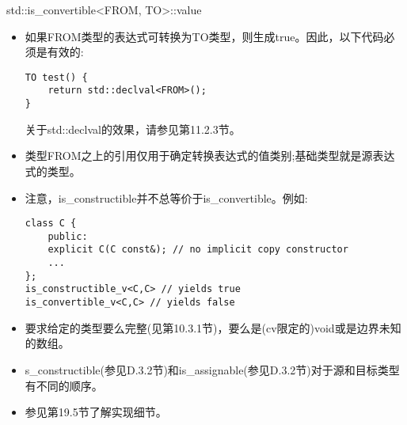 std::is\_convertible<FROM, TO>::value

\begin{itemize}
\item
如果FROM类型的表达式可转换为TO类型，则生成true。因此，以下代码必须是有效的:

\begin{lstlisting}[style=styleCXX]
TO test() {
	return std::declval<FROM>();
}
\end{lstlisting}

\begin{tcolorbox}[colback=webgreen!5!white,colframe=webgreen!75!black]
\hspace*{0.75cm}关于std::declval的效果，请参见第11.2.3节。
\end{tcolorbox}

\item
类型FROM之上的引用仅用于确定转换表达式的值类别;基础类型就是源表达式的类型。

\item
注意，is\_constructible并不总等价于is\_convertible。例如:

\begin{lstlisting}[style=styleCXX]
class C {
	public:
	explicit C(C const&); // no implicit copy constructor
	...
};
is_constructible_v<C,C> // yields true
is_convertible_v<C,C> // yields false
\end{lstlisting}

\item
要求给定的类型要么完整(见第10.3.1节)，要么是(cv限定的)void或是边界未知的数组。

\item
s\_constructible(参见D.3.2节)和is\_assignable(参见D.3.2节)对于源和目标类型有不同的顺序。

\item
参见第19.5节了解实现细节。
\end{itemize}